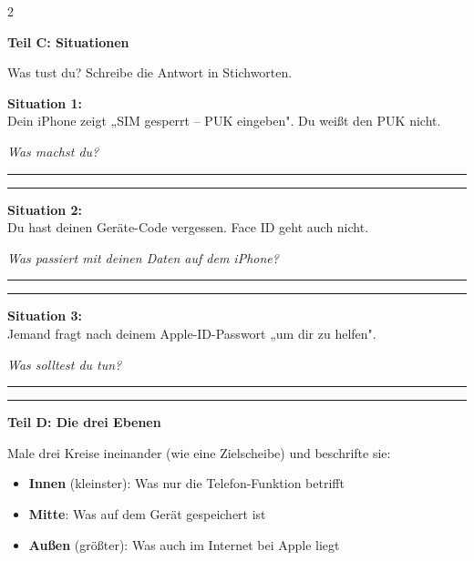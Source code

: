 \documentclass[a4paper,landscape,8pt]{extarticle}
\begin{document}
\begin{multicols}{2}
\columnbreak

\textbf{\large Teil C: Situationen}

Was tust du? Schreibe die Antwort in Stichworten.

\vspace{3mm}

\textbf{Situation 1:}\\
Dein iPhone zeigt „SIM gesperrt -- PUK eingeben". Du weißt den PUK nicht.

\textit{Was machst du?}
\vspace{8mm}

\rule{\linewidth}{0.4pt}
\vspace{5mm}

\rule{\linewidth}{0.4pt}

\vspace{5mm}

\textbf{Situation 2:}\\
Du hast deinen Geräte-Code vergessen. Face ID geht auch nicht.

\textit{Was passiert mit deinen Daten auf dem iPhone?}
\vspace{8mm}

\rule{\linewidth}{0.4pt}
\vspace{5mm}

\rule{\linewidth}{0.4pt}

\vspace{5mm}

\textbf{Situation 3:}\\
Jemand fragt nach deinem Apple-ID-Passwort „um dir zu helfen".

\textit{Was solltest du tun?}
\vspace{8mm}

\rule{\linewidth}{0.4pt}
\vspace{5mm}

\rule{\linewidth}{0.4pt}

\vspace{8mm}

\textbf{\large Teil D: Die drei Ebenen}

Male drei Kreise ineinander (wie eine Zielscheibe) und beschrifte sie:

\begin{itemize}
\item \textbf{Innen} (kleinster): Was nur die Telefon-Funktion betrifft
\item \textbf{Mitte}: Was auf dem Gerät gespeichert ist
\item \textbf{Außen} (größter): Was auch im Internet bei Apple liegt
\end{itemize}

\end{multicols}
\end{document}
